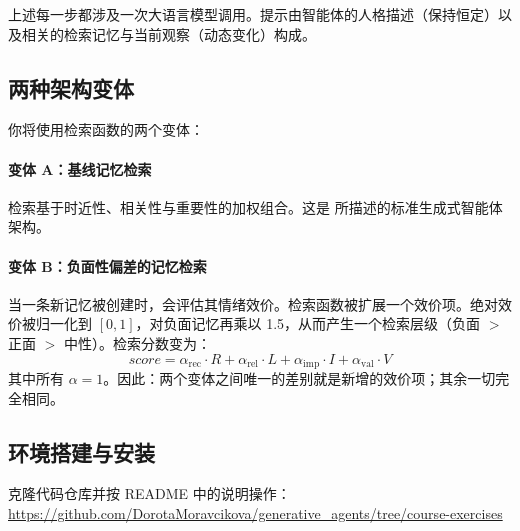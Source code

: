 上述每一步都涉及一次大语言模型调用。提示由智能体的人格描述（保持恒定）以及相关的检索记忆与当前观察（动态变化）构成。

\subsection{两种架构变体}

你将使用检索函数的两个变体：

\paragraph{变体 A：基线记忆检索}
检索基于时近性、相关性与重要性的加权组合。这是 \citet{park2023generative} 所描述的标准生成式智能体架构。

\paragraph{变体 B：负面性偏差的记忆检索}
当一条新记忆被创建时，会评估其情绪效价。检索函数被扩展一个效价项。绝对效价被归一化到 $[0, 1]$，对负面记忆再乘以 1.5，从而产生一个检索层级（负面 $>$ 正面 $>$ 中性）。检索分数变为：
\begin{equation}\label{eq:retrieval-never}
    \textit{score} = \alpha_{\text{rec}} \cdot R + \alpha_{\text{rel}} \cdot L + \alpha_{\text{imp}} \cdot I + \alpha_{\text{val}} \cdot V
\end{equation}
其中所有 $\alpha = 1$。因此：两个变体之间唯一的差别就是新增的效价项；其余一切完全相同。

\subsection{环境搭建与安装}

克隆代码仓库并按 README 中的说明操作：\\
\url{https://github.com/DorotaMoravcikova/generative_agents/tree/course-exercises}

